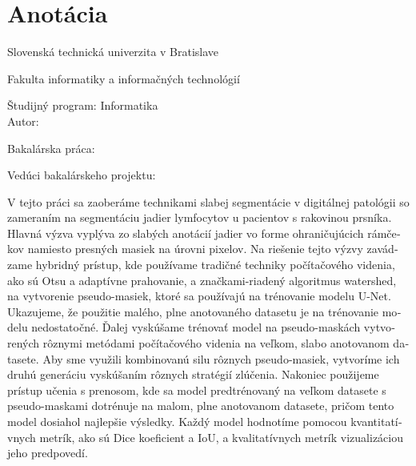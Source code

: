 

\newpage{}\thispagestyle{empty}



\thispagestyle{empty}
\section*{Anotácia}

\begin{minipage}[t]{1\columnwidth}%
Slovenská technická univerzita v Bratislave

Fakulta informatiky a informačných technológií

Študijný program: Informatika\\

Autor: \myName

Bakalárska práca: \myTitle

Vedúci bakalárskeho projektu: \mySupervisor

\myDateSK%
\end{minipage}

\bigskip{}
\begin{otherlanguage}{slovak}
V tejto práci sa zaoberáme technikami slabej segmentácie v digitálnej patológii so zameraním na segmentáciu jadier lymfocytov u pacientov s rakovinou prsníka. Hlavná výzva vyplýva zo slabých anotácií jadier vo forme ohraničujúcich rámčekov namiesto presných masiek na úrovni pixelov. Na riešenie tejto výzvy zavádzame hybridný prístup, kde používame tradičné techniky počítačového videnia, ako sú Otsu a adaptívne prahovanie, a značkami-riadený algoritmus watershed, na vytvorenie pseudo-masiek, ktoré sa používajú na trénovanie modelu U-Net. Ukazujeme, že použitie malého, plne anotovaného datasetu je na trénovanie modelu nedostatočné. Ďalej vyskúšame trénovať model na pseudo-maskách vytvorených rôznymi metódami počítačového videnia na veľkom, slabo anotovanom datasete. Aby sme využili kombinovanú silu rôznych pseudo-masiek, vytvoríme ich druhú generáciu vyskúšaním rôznych stratégií zlúčenia. Nakoniec použijeme prístup učenia s prenosom, kde sa model predtrénovaný na veľkom datasete s pseudo-maskami dotrénuje na malom, plne anotovanom datasete, pričom tento model dosiahol najlepšie výsledky. Každý model hodnotíme pomocou kvantitatívnych metrík, ako sú Dice koeficient a IoU, a kvalitatívnych metrík vizualizáciou jeho predpovedí.
\end{otherlanguage}


\newpage{}\thispagestyle{empty}\medskip{}


\newpage{}



\newpage

